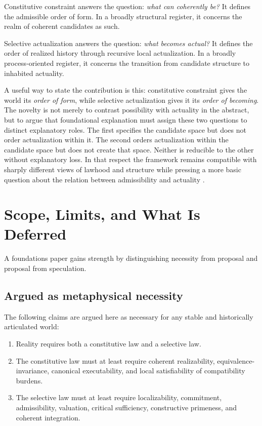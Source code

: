 \documentclass[11pt]{article}
\theoremstyle{foundation}
\begin{document}
Constitutive constraint answers the question: \emph{what can coherently be?} It defines the admissible order of form. In a broadly structural register, it concerns the realm of coherent candidates as such.

Selective actualization answers the question: \emph{what becomes actual?} It defines the order of realized history through recursive local actualization. In a broadly process-oriented register, it concerns the transition from candidate structure to inhabited actuality.

A useful way to state the contribution is this: constitutive constraint gives the world its \emph{order of form}, while selective actualization gives it its \emph{order of becoming}. The novelty is not merely to contrast possibility with actuality in the abstract, but to argue that foundational explanation must assign these two questions to distinct explanatory roles. The first specifies the candidate space but does not order actualization within it. The second orders actualization within the candidate space but does not create that space. Neither is reducible to the other without explanatory loss. In that respect the framework remains compatible with sharply different views of lawhood and structure while pressing a more basic question about the relation between admissibility and actuality \citep{Armstrong1983,vanFraassen1989,Maudlin2007,French2014}.

\section{Scope, Limits, and What Is Deferred}

A foundations paper gains strength by distinguishing necessity from proposal and proposal from speculation.

\subsection{Argued as metaphysical necessity}

The following claims are argued here as necessary for any stable and historically articulated world:

\begin{enumerate}
    \item Reality requires both a constitutive law and a selective law.
    \item The constitutive law must at least require coherent realizability, equivalence-invariance, canonical executability, and local satisfiability of compatibility burdens.
    \item The selective law must at least require localizability, commitment, admissibility, valuation, critical sufficiency, constructive primeness, and coherent integration.
\end{enumerate}
\end{document}
